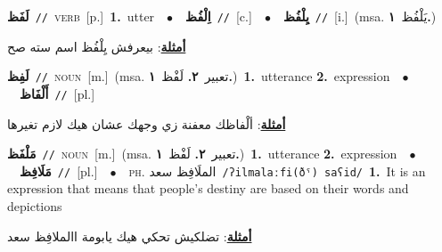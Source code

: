 \documentclass[10pt,a4paper,twoside]{article} %
\begin{document}
\begin{multicols}{2}
{\setlength\topsep{0pt}\textbf{\foreignlanguage{arabic}{لَفَظ}}\ {\color{gray}\texttt{//}\color{black}}\ \textsc{verb}\ [p.]\ \textbf{1.}~utter\ \ $\bullet$\ \ \setlength\topsep{0pt}\textbf{\foreignlanguage{arabic}{اِلْفُظ}}\ {\color{gray}\texttt{//}\color{black}}\ [c.]\ \ $\bullet$\ \ \setlength\topsep{0pt}\textbf{\foreignlanguage{arabic}{يِلْفُظ}}\ {\color{gray}\texttt{//}\color{black}}\ [i.]\ \color{gray}(msa. \foreignlanguage{arabic}{يَلْفُظ}~\foreignlanguage{arabic}{\textbf{١.}})\color{black}\  \begin{flushright}\color{gray}\foreignlanguage{arabic}{\textbf{\underline{\foreignlanguage{arabic}{أمثلة}}}: بيعرفش يِلْفُظ اسم سته صح}\end{flushright}\color{black}} \vspace{2mm}

{\setlength\topsep{0pt}\textbf{\foreignlanguage{arabic}{لَفِظ}}\ {\color{gray}\texttt{//}\color{black}}\ \textsc{noun}\ [m.]\ \color{gray}(msa. \foreignlanguage{arabic}{تعبير}~\foreignlanguage{arabic}{\textbf{٢.}}  \foreignlanguage{arabic}{لَفْظ}~\foreignlanguage{arabic}{\textbf{١.}})\color{black}\ \textbf{1.}~utterance  \textbf{2.}~expression\ \ $\bullet$\ \ \setlength\topsep{0pt}\textbf{\foreignlanguage{arabic}{أَلْفَاظ}}\ {\color{gray}\texttt{//}\color{black}}\ [pl.]\  \begin{flushright}\color{gray}\foreignlanguage{arabic}{\textbf{\underline{\foreignlanguage{arabic}{أمثلة}}}: ألْفاظك معفنة زي وجهك عشان هيك لازم تغيرها}\end{flushright}\color{black}} \vspace{2mm}

{\setlength\topsep{0pt}\textbf{\foreignlanguage{arabic}{مَلْفَظ}}\ {\color{gray}\texttt{//}\color{black}}\ \textsc{noun}\ [m.]\ \color{gray}(msa. \foreignlanguage{arabic}{تعبير}~\foreignlanguage{arabic}{\textbf{٢.}}  \foreignlanguage{arabic}{لَفْظ}~\foreignlanguage{arabic}{\textbf{١.}})\color{black}\ \textbf{1.}~utterance  \textbf{2.}~expression\ \ $\bullet$\ \ \setlength\topsep{0pt}\textbf{\foreignlanguage{arabic}{مَلَافِظ}}\ {\color{gray}\texttt{//}\color{black}}\ [pl.]\ \ $\bullet$\ \ \textsc{ph.} \color{gray} \foreignlanguage{arabic}{الملَافِظ سعد}\color{black}\ {\color{gray}\texttt{/{\sffamily ʔilmalaːfi(ðˤ) saʕid}/}\color{black}}\ \textbf{1.}~It is an expression that means that people's destiny are based on their words and depictions\  \begin{flushright}\color{gray}\foreignlanguage{arabic}{\textbf{\underline{\foreignlanguage{arabic}{أمثلة}}}: تضلكيش تحكي هيك يابومة االملافِظ سعد}\end{flushright}\color{black}} \vspace{2mm}


\end{multicols}
\end{document}
